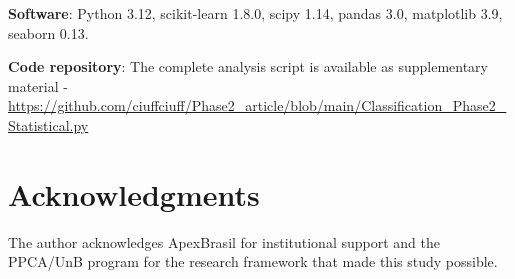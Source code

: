 \documentclass[alpha-refs,english]{RBCA_v3.0}
\begin{document}
\textbf{Software}: Python 3.12, scikit-learn 1.8.0, scipy 1.14, pandas 3.0, matplotlib 3.9, seaborn 0.13.

\textbf{Code repository}: The complete analysis script is available as supplementary material -  \url{https://github.com/ciuffciuff/Phase2_article/blob/main/Classification_Phase2_Statistical.py}


\section*{Acknowledgments}

The author acknowledges ApexBrasil for institutional support and the PPCA/UnB program for the research framework that made this study possible.



\end{document}

